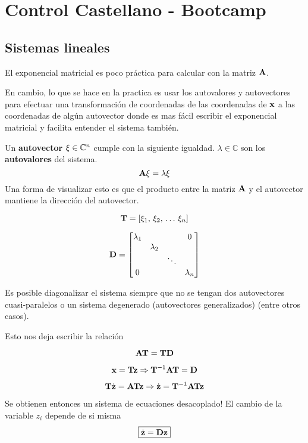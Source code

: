 \documentclass[11pt, a4paper, twoside, openright, openany]{book}
\newcommand{\dimss}{\dimfont{n}}
\begin{document}
\tableofcontents
\part{Control Castellano - Bootcamp}
\chapter{Sistemas lineales}

El exponencial matricial es poco práctica para calcular con la matriz \(\mathbf{A}\).

En cambio, lo que se hace en la practica es usar los autovalores y autovectores para efectuar una transformación de coordenadas de las coordenadas de $\mathbf{x}$ a las coordenadas de algún autovector donde es mas fácil escribir el exponencial matricial y facilita entender el sistema también.

Un \textbf{autovector} $\Cme{\xi}\in\mathbb{C}^\dimss$ cumple con la siguiente igualdad. $\lambda \in \mathbb{C}$ son los \textbf{autovalores} del sistema.
\[
\mathbf{A}\mathbf{\xi} = \lambda \mathbf{\xi}
\]
Una forma de visualizar esto es que el producto entre la matriz $\mathbf{A}$ y el autovector mantiene la dirección del autovector.

\[
\Mme{T} = \left[ \xi_1,\, \xi_2,\, \ldots\, \xi_\dimss \right]
\]

\[
\Mme{D}= \begin{bmatrix}
\lambda_1 & & & 0 \\
 & \lambda_2 & & \\
  & & \ddots & \\
 0 & & & \lambda_\dimss 
\end{bmatrix}
\]

Es posible diagonalizar el sistema siempre que no se tengan dos autovectores cuasi-paralelos o un sistema degenerado (autovectores generalizados) (entre otros casos). 

Esto nos deja escribir la relación

\[
\mathbf{A} \mathbf{T} = \mathbf{T} \mathbf{D}
\]

\[
\mathbf{x} = \mathbf{T}\mathbf{z} \Rightarrow \mathbf{T}^{-1} \mathbf{A} \mathbf{T} = \mathbf{D}
\]

\[
\mathbf{T} \dot{\mathbf{z}} = \mathbf{A} \mathbf{T} \mathbf{z} \Rightarrow \dot{\mathbf{z}} = \mathbf{T}^{-1} \mathbf{A} \mathbf{T} \mathbf{z}
\]

Se obtienen entonces un sistema de ecuaciones desacoplado! El cambio de la variable $z_i$ depende de si misma
\[
\boxed{\dot{\mathbf{z}} = \mathbf{D} \mathbf{z}}
\]
\end{document}
